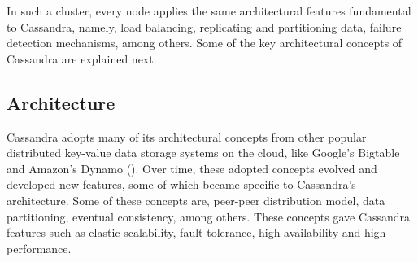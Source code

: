 In such a cluster,  every node applies the same architectural features
fundamental to Cassandra,  namely,  load balancing,  replicating
and partitioning data,  failure detection mechanisms, among others.  Some of the
key architectural concepts of Cassandra are explained next. 




\subsection{Architecture} \label{ss:Background-Cassandra-Archi}
Cassandra adopts many of its  architectural concepts from other popular
distributed key-value data storage systems on the cloud,  like Google's Bigtable
and Amazon's Dynamo ().  Over time, these adopted concepts evolved
and developed new features,  some of which became specific to Cassandra's
architecture. Some of these  concepts are, peer-peer distribution model, data
partitioning, eventual consistency, among others. These  concepts gave Cassandra
  features such as elastic scalability,  fault tolerance, high availability and
high performance.



